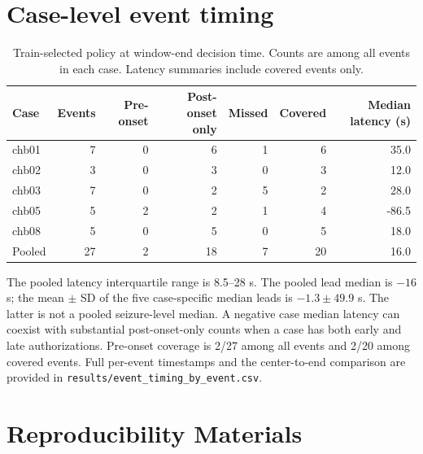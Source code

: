 \documentclass[11pt,a4paper]{article}
\begin{document}
\section{Case-level event timing}
\begin{table}[htbp]
\centering
\caption{Train-selected policy at window-end decision time. Counts are among all events in each case. Latency summaries include covered events only.}
\label{tab:complete_timing_cases}
\small
\setlength{\tabcolsep}{4pt}
\begin{tabular}{@{}lrrrrrr@{}}
\toprule
Case & Events & Pre-onset & Post-onset only & Missed & Covered & Median latency (s) \\
\midrule
chb01 & 7 & 0 & 6 & 1 & 6 & 35.0 \\
chb02 & 3 & 0 & 3 & 0 & 3 & 12.0 \\
chb03 & 7 & 0 & 2 & 5 & 2 & 28.0 \\
chb05 & 5 & 2 & 2 & 1 & 4 & -86.5 \\
chb08 & 5 & 0 & 5 & 0 & 5 & 18.0 \\
\midrule
Pooled & 27 & 2 & 18 & 7 & 20 & 16.0 \\
\bottomrule
\end{tabular}
\end{table}
The pooled latency interquartile range is 8.5--28 s. The pooled lead median is $-16$ s; the mean $\pm$ SD of the five case-specific median leads is $-1.3\pm49.9$ s. The latter is not a pooled seizure-level median. A negative case median latency can coexist with substantial post-onset-only counts when a case has both early and late authorizations. Pre-onset coverage is 2/27 among all events and 2/20 among covered events. Full per-event timestamps and the center-to-end comparison are provided in \texttt{results/event\_timing\_by\_event.csv}.

\section{Reproducibility Materials}
\end{document}
